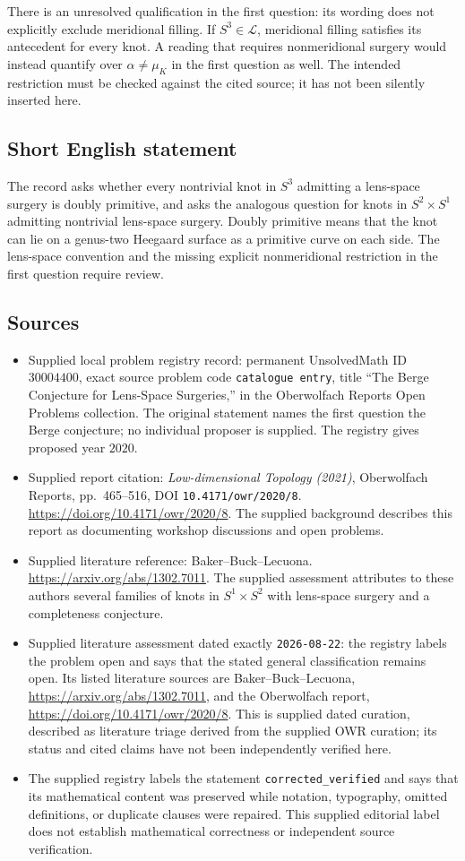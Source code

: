 \documentclass[11pt]{article}
\begin{document}
There is an unresolved qualification in the first question: its wording does not explicitly exclude meridional filling. If \(S^3\in\mathcal L\), meridional filling satisfies its antecedent for every knot. A reading that requires nonmeridional surgery would instead quantify over \(\alpha\ne\mu_K\) in the first question as well. The intended restriction must be checked against the cited source; it has not been silently inserted here.
\subsection{Short English statement}
The record asks whether every nontrivial knot in \(S^3\) admitting a lens-space surgery is doubly primitive, and asks the analogous question for knots in \(S^2\times S^1\) admitting nontrivial lens-space surgery. Doubly primitive means that the knot can lie on a genus-two Heegaard surface as a primitive curve on each side. The lens-space convention and the missing explicit nonmeridional restriction in the first question require review.
\subsection{Sources}
\begin{itemize}
\item Supplied local problem registry record: permanent UnsolvedMath ID \(30004400\), exact source problem code \texttt{catalogue entry}, title ``The Berge Conjecture for Lens-Space Surgeries,'' in the Oberwolfach Reports Open Problems collection. The original statement names the first question the Berge conjecture; no individual proposer is supplied. The registry gives proposed year \(2020\).
\item Supplied report citation: \emph{Low-dimensional Topology (2021)}, Oberwolfach Reports, pp.\ 465--516, DOI \texttt{10.4171/owr/2020/8}. \url{https://doi.org/10.4171/owr/2020/8}. The supplied background describes this report as documenting workshop discussions and open problems.
\item Supplied literature reference: Baker--Buck--Lecuona. \url{https://arxiv.org/abs/1302.7011}. The supplied assessment attributes to these authors several families of knots in \(S^1\times S^2\) with lens-space surgery and a completeness conjecture.
\item Supplied literature assessment dated exactly \texttt{2026-08-22}: the registry labels the problem open and says that the stated general classification remains open. Its listed literature sources are Baker--Buck--Lecuona, \url{https://arxiv.org/abs/1302.7011}, and the Oberwolfach report, \url{https://doi.org/10.4171/owr/2020/8}. This is supplied dated curation, described as literature triage derived from the supplied OWR curation; its status and cited claims have not been independently verified here.
\item The supplied registry labels the statement \texttt{corrected\_verified} and says that its mathematical content was preserved while notation, typography, omitted definitions, or duplicate clauses were repaired. This supplied editorial label does not establish mathematical correctness or independent source verification.
\end{itemize}
\end{document}
